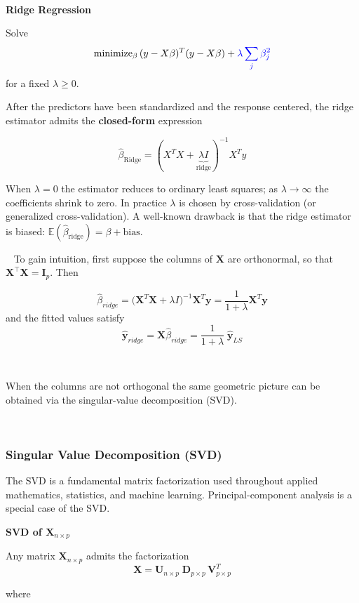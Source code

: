 \documentclass[
]{book}
\begin{document}
~

\textbf{Ridge Regression}

Solve
\[\text{minimize}_{\beta}\,  (y-X \beta)^T(y-X \beta) + {\color{blue}{\lambda \sum_j \beta_j^2}}\]
for a fixed \(\lambda \ge 0\).

After the predictors have been standardized and the response centered, the ridge estimator admits the \textbf{closed-form} expression

\[\hat{\beta}_{\text{Ridge}}=(X^T X+\underbrace{\lambda I}_{\text{ridge}})^{-1} X^T y\]

When \(\lambda=0\) the estimator reduces to ordinary least squares; as \(\lambda\to\infty\) the coefficients shrink to zero. In practice \(\lambda\) is chosen by cross-validation (or generalized cross-validation). A well-known drawback is that the ridge estimator is biased: \(\mathbb{E}(\hat{\beta}_{\text{ridge}})=\beta+\text{bias}\).

~
To gain intuition, first suppose the columns of \(\mathbf{X}\) are orthonormal, so that \(\mathbf{X}^\top\mathbf{X}=\mathbf{I}_p\). Then

\[\hat{\beta}_{ridge} = \bigl(\mathbf{X}^T \mathbf{X} + \lambda I \bigr)^{-1} \mathbf{X}^T \mathbf{y} = \frac{1}{1+\lambda} \mathbf{X}^T \mathbf{y}\]
and the fitted values satisfy
\[\hat{\mathbf{y}}_{ridge} = \mathbf{X} \hat{\beta}_{ridge} = \frac{1}{1+\lambda}\; \hat{\mathbf{y}}_{LS} \]

~

When the columns are not orthogonal the same geometric picture can be obtained via the singular-value decomposition (SVD).

~

\subsubsection*{Singular Value Decomposition (SVD)}\label{singular-value-decomposition-svd}

The SVD is a fundamental matrix factorization used throughout applied mathematics, statistics, and machine learning. Principal-component analysis is a special case of the SVD.

\textbf{SVD of \(\mathbf{X}_{n\times p}\)}

Any matrix \(\mathbf{X}_{n\times p}\) admits the factorization
\[\mathbf{X} = \mathbf{U}_{n\times p} \; \mathbf{D}_{p\times p}\, \mathbf{V}_{p\times p}^T\]

where
\end{document}
